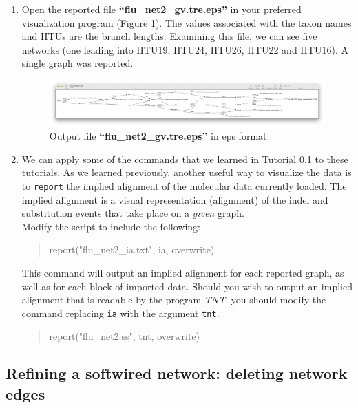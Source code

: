 \documentclass[11pt]{article}
\begin{document}
\begin {enumerate}
\item  Open the reported file \textbf{``flu\_net2\_gv.tre.eps''}  in your preferred
visualization program (Figure \ref{eps2}). The values associated with the taxon 
names and HTUs are the branch lengths. Examining this file, we can see five 
networks (one leading into HTU19, HTU24, HTU26, HTU22 and HTU16). A single
graph was reported.

\begin{figure}[H]
\centering
\includegraphics[width=\textwidth]{eps2.png}
\caption{Output file \textbf{``flu\_net2\_gv.tre.eps''} in eps format.}
\label{eps2}
\end{figure}

\item We can apply some of the commands that we learned in Tutorial 0.1 to
these tutorials. As we learned previously, another useful way to visualize the data 
is to \texttt{report} the implied alignment of the molecular data currently loaded. 
The implied alignment is a visual representation (alignment) of the indel and 
substitution events that take place on a \textit{given} graph. \\

Modify the script to include the following: 

\begin{quote}
report("flu\_net2\_ia.txt", ia, overwrite)
\end{quote}

This command will output an implied alignment for each reported graph, as well as 
for each block of imported data. Should you wish to output an implied alignment
that is readable by the program \textit{TNT}, you should modify the command  
replacing \texttt{ia} with the argument \texttt{tnt}.

\begin{quote}
report("flu\_net2.ss", tnt, overwrite)
\end{quote}

\end{enumerate}

\subsection{Refining a softwired network: deleting network edges}
\label{subsec:netdel}
\end{document}

